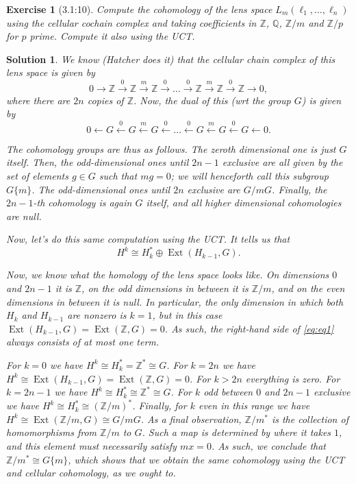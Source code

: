\documentclass{article}
\theoremstyle{plain}
\newtheorem*{ex}{Exercise}
\theoremstyle{nonumberplain}
\newtheorem{sol}{Solution}
\newcommand{\Z}{\mathbb{Z}}
\newcommand{\Q}{\mathbb{Q}}
\DeclareMathOperator{\Ext}{Ext}
\begin{document}
\begin{ex}[3.1:10]
Compute the cohomology of the lens space $L_m(\ell_1, \dots, \ell_n)$ using the cellular cochain complex and taking coefficients in $\Z$, $\Q$, $\Z/m$ and $\Z/p$ for $p$ prime. Compute it also using the UCT.
\end{ex}

\begin{sol}
We know (Hatcher does it) that the cellular chain complex of this lens space is given by
\begin{equation}
0 \to \Z \xrightarrow 0 \Z \xrightarrow m \Z \xrightarrow 0 \dots \xrightarrow 0 \Z \xrightarrow m \Z \xrightarrow 0 \Z \to 0,
\end{equation}
where there are $2n$ copies of $\Z$. Now, the dual of this (wrt the group $G$) is given by
\begin{equation}
0 \leftarrow G \xleftarrow 0 G \xleftarrow m G \xleftarrow 0 \dots \xleftarrow 0 G \xleftarrow m G \xleftarrow 0 G \leftarrow 0.
\end{equation}

The cohomology groups are thus as follows. The zeroth dimensional one is just $G$ itself. Then, the odd-dimensional ones until $2n-1$ exclusive are all given by the set of elements $g \in G$ such that $mg = 0$; we will henceforth call this subgroup $G\{m\}$. The odd-dimensional ones until $2n$ exclusive are $G/mG$. Finally, the $2n-1$-th cohomology is again $G$ itself, and all higher dimensional cohomologies are null.

\smallskip

Now, let's do this same computation using the UCT. It tells us that
\begin{equation}\label{eq:eq1}
H^k \cong H_k^* \oplus \Ext(H_{k-1}, G).
\end{equation}

Now, we know what the homology of the lens space looks like. On dimensions $0$ and $2n-1$ it is $\Z$, on the odd dimensions in between it is $\Z/m$, and on the even dimensions in between it is null. In particular, the only dimension in which both $H_k$ and $H_{k-1}$ are nonzero is $k = 1$, but in this case $\Ext(H_{k-1}, G) = \Ext(\Z, G) = 0$. As such, the right-hand side of \eqref{eq:eq1} always consists of at most one term.

For $k = 0$ we have $H^k \cong H_k^* = \Z^* \cong G$. For $k = 2n$ we have $H^k \cong \Ext(H_{k-1},G) = \Ext(\Z,G) = 0$. For $k > 2n$ everything is zero. For $k = 2n-1$ we have $H^k \cong H_k^* \cong \Z^* \cong G$. For $k$ odd between $0$ and $2n-1$ exclusive we have $H^k \cong H_k^* \cong (\Z/m)^*$. Finally, for $k$ even in this range we have $H^k \cong \Ext(\Z/m, G) \cong G/mG$. As a final observation, $\Z/m^*$ is the collection of homomorphisms from $\Z/m$ to $G$. Such a map is determined by where it takes $1$, and this element must necessarily satisfy $mx = 0$. As such, we conclude that $\Z/m^* \cong G\{m\}$, which shows that we obtain the same cohomology using the UCT and cellular cohomology, as we ought to.


\end{sol}
\end{document}
